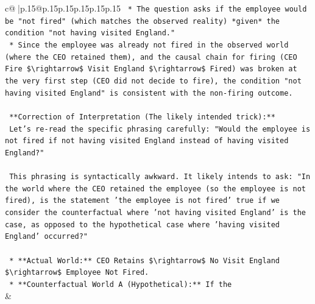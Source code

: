 \documentclass{article}
\begin{document}
{\begin{supertabular}{c@{$\;$}|p{.15\linewidth}@{}p{.15\linewidth}p{.15\linewidth}p{.15\linewidth}p{.15\linewidth}p{.15\linewidth}}
{{{\texttt{    *   The question asks if the employee would be "not fired" (which matches the observed reality) *given* the condition "not having visited England."} \\
\texttt{    *   Since the employee was already not fired in the observed world (where the CEO retained them), and the causal chain for firing (CEO Fire \$\textbackslash{}rightarrow\$ Visit England \$\textbackslash{}rightarrow\$ Fired) was broken at the very first step (CEO did not decide to fire), the condition "not having visited England" is consistent with the non{-}firing outcome.} \\
\\ 
\texttt{    **Correction of Interpretation (The likely intended trick):**} \\
\texttt{    Let's re{-}read the specific phrasing carefully: "Would the employee is not fired if not having visited England instead of having visited England?"} \\
\\ 
\texttt{    This phrasing is syntactically awkward. It likely intends to ask: "In the world where the CEO retained the employee (so the employee is not fired), is the statement 'the employee is not fired' true if we consider the counterfactual where 'not having visited England' is the case, as opposed to the hypothetical case where 'having visited England' occurred?"} \\
\\ 
\texttt{    *   **Actual World:** CEO Retains \$\textbackslash{}rightarrow\$ No Visit England \$\textbackslash{}rightarrow\$ Employee Not Fired.} \\
\texttt{    *   **Counterfactual World A (Hypothetical):** If the} \\
            }
        }
    }
    & \\ \\


\end{supertabular}}
\end{document}
